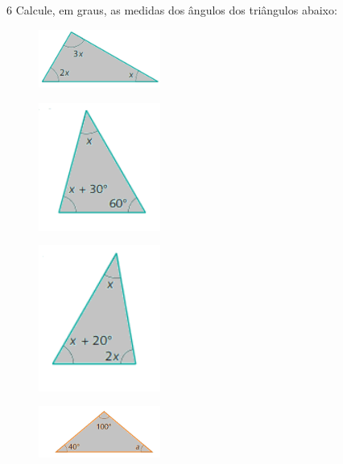 {{\num{6} Calcule, em graus, as medidas dos ângulos dos triângulos abaixo:

\begin{multicols}{2}
\begin{escolha}
\item
\begin{figure}[H]
\centering\includegraphics[width=4cm]{./imgSAEB_8_MAT/media/image24.png}
\end{figure}
\item
\begin{figure}[H]
\centering\includegraphics[width=4cm]{./imgSAEB_8_MAT/media/image25.png}
\end{figure}
\item
\begin{figure}[H]
\centering\includegraphics[width=4cm]{./imgSAEB_8_MAT/media/image26.png}
\end{figure}
\item
\begin{figure}[H]
\centering\includegraphics[width=4cm]{./imgSAEB_8_MAT/media/image27.png}
\end{figure}
\item
\begin{figure}[H]

\end{figure}
\end{escolha}
\end{multicols}}}
